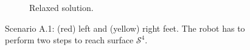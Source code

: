 \begin{figure}[ht]
\begin{subfigure}[t]{0.48\linewidth}
    \caption{Relaxed solution.}
    \label{fig:sl1m:a11:1}
    \end{subfigure}
    \caption{Scenario A.1: (red) left and (yellow) right feet. The robot has to perform two steps to reach surface $\mathcal{S}^4$.}
    \label{fig:sl1m:a11}
\end{figure}
